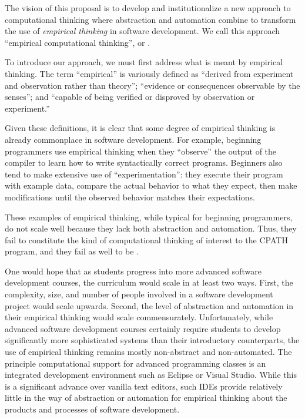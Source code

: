 The vision of this proposal is to develop and institutionalize a new
approach to computational thinking where abstraction and automation combine
to transform the use of {\em empirical thinking} in software development.
We call this approach ``empirical computational thinking'', or \eCT.

To introduce our approach, we must first address what is meant by
empirical thinking.  The term ``empirical'' is variously defined as
``derived from experiment and observation rather than theory''; ``evidence
or consequences observable by the senses''; and ``capable of being verified
or disproved by observation or experiment.''

Given these definitions, it is clear that some degree of empirical thinking
is already commonplace in software development.  For example, beginning
programmers use empirical thinking when they ``observe'' the output of the
compiler to learn how to write syntactically correct programs.  Beginners
also tend to make extensive use of ``experimentation'': they execute their
program with example data, compare the actual behavior to what they expect,
then make modifications until the observed behavior matches their
expectations.

These examples of empirical thinking, while typical for beginning
programmers, do not scale well because they lack both abstraction and
automation. Thus, they fail to constitute the kind of computational
thinking of interest to the CPATH program, and they fail as well to be
\eCT.

One would hope that as students progress into more advanced software
development courses, the curriculum would scale in at least two
ways. First, the complexity, size, and number of people involved in a
software development project would scale upwards.  Second, the level of
abstraction and automation in their empirical thinking would scale
commensurately. Unfortunately, while advanced software development courses
certainly require students to develop significantly more sophisticated
systems than their introductory counterparts, the use of empirical thinking
remains mostly non-abstract and non-automated.  The principle computational
support for advanced programming classes is an integrated development
environment such as Eclipse or Visual Studio. While this is a significant
advance over vanilla text editors, such IDEs provide relatively little in
the way of abstraction or automation for empirical thinking about the
products and processes of software development.

